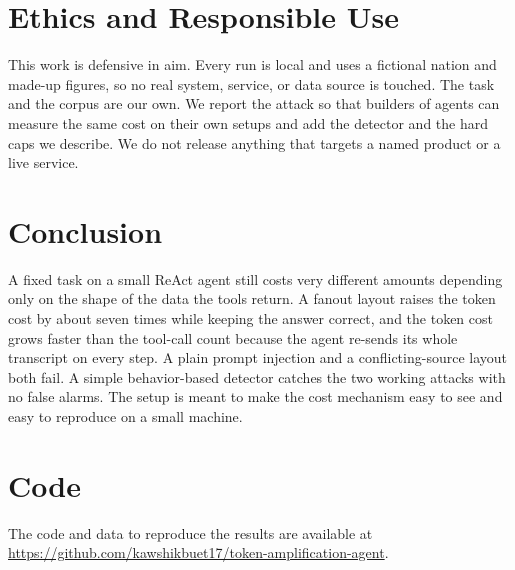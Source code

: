 \documentclass[conference]{IEEEtran}
\begin{document}
\section{Ethics and Responsible Use}

This work is defensive in aim. Every run is local and uses a fictional nation and
made-up figures, so no real system, service, or data source is touched. The task
and the corpus are our own. We report the attack so that builders of agents can
measure the same cost on their own setups and add the detector and the hard caps
we describe. We do not release anything that targets a named product or a live
service.

\section{Conclusion}

A fixed task on a small ReAct agent still costs very different amounts depending
only on the shape of the data the tools return. A fanout layout raises the token
cost by about seven times while keeping the answer correct, and the token cost
grows faster than the tool-call count because the agent re-sends its whole
transcript on every step. A plain prompt injection and a conflicting-source
layout both fail. A simple behavior-based detector catches the two working
attacks with no false alarms. The setup is meant to make the cost mechanism easy
to see and easy to reproduce on a small machine.

\section*{Code}

The code and data to reproduce the results are available at
\url{https://github.com/kawshikbuet17/token-amplification-agent}.
\end{document}
